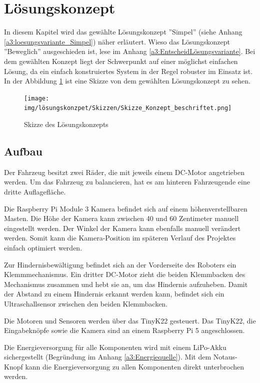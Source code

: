 \documentclass[../main.tex]{subfiles}
\begin{document}
\newpage
\section{Lösungskonzept}

In diesem Kapitel wird das gewählte Lösungskonzept ''Simpel'' (siehe Anhang \ref{a3:loesungsvariante_Simpel}) näher erläutert. Wieso das Lösungskonzept ''Beweglich'' ausgeschieden ist, lese im Anhang \ref{a3:EntscheidLösungsvariante}. Bei dem gewählten Konzept liegt der Schwerpunkt auf einer möglichst einfachen Lösung, da ein einfach konstruiertes System in der Regel robuster im Einsatz ist. In der Abbildung \ref{img:Konzept-Skizze_Fahrzeug} ist eine Skizze von dem gewählten Lösungskonzept zu sehen.

\begin{figure}[H]
\centering
\texttt{[image: img/lösungskonzpet/Skizzen/Skizze\_Konzept\_beschriftet.png]}
\caption{Skizze des Lösungskonzepts}
\label{img:Konzept-Skizze_Fahrzeug}
\end{figure}

\subsection{Aufbau}

Der Fahrzeug besitzt zwei Räder, die mit jeweils einem DC-Motor angetrieben werden. Um das Fahrzeug zu balancieren, hat es am hinteren Fahrzeugende eine dritte Auflagefläche.

Die Raspberry Pi Module 3 Kamera befindet sich auf einem höhenverstellbaren Masten. Die Höhe der Kamera kann zwischen 40 und 60 Zentimeter manuell eingestellt werden. Der Winkel der Kamera kann ebenfalls manuell verändert werden. Somit kann die Kamera-Position im späteren Verlauf des Projektes einfach optimiert werden.

Zur Hindernisbewältigung befindet sich an der Vorderseite des Roboters ein Klemmmechanismus. Ein dritter DC-Motor zieht die beiden Klemmbacken des Mechanismus zusammen und hebt sie an, um das Hindernis aufzuheben. Damit der Abstand zu einem Hindernis erkannt werden kann, befindet sich ein Ultraschallsensor zwischen den beiden Klemmbacken. 

Die Motoren und Sensoren werden über das TinyK22 gesteuert.
Das TinyK22, die Eingabeknöpfe sowie die Kamera sind an einem Raspberry Pi 5 angeschlossen.

Die Energieversorgung für alle Komponenten wird mit einem LiPo-Akku sichergestellt (Begründung im Anhang \ref{a3:Energiequelle}).
Mit dem Notaus-Knopf kann die Energieversorgung zu allen Komponenten direkt unterbrochen werden.
\newpage
\end{document}
